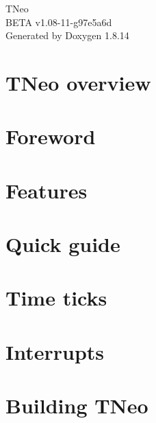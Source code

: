 \documentclass[twoside]{book}
\newcommand{\+}{\discretionary{\mbox{\scriptsize$\hookleftarrow$}}{}{}}
\newcommand{\clearemptydoublepage}{%
  \newpage{\pagestyle{empty}\cleardoublepage}%
}
\begin{document}
\hypersetup{pageanchor=false,
             bookmarksnumbered=true,
             pdfencoding=unicode
            }
\begin{titlepage}
\vspace*{7cm}
\begin{center}%
{\Large T\+Neo \\[1ex]\large B\+E\+TA v1.\+08-\/11-\/g97e5a6d }\\
\vspace*{1cm}
{\large Generated by Doxygen 1.8.14}\\
\end{center}
\end{titlepage}
\clearemptydoublepage
{}
\tableofcontents
\clearemptydoublepage
{}
\hypersetup{pageanchor=true}

\chapter{T\+Neo overview}
\label{index}\hypertarget{index}{}
\chapter{Foreword}
\label{foreword}

\chapter{Features}
\label{features}

\chapter{Quick guide}
\label{quick_guide}

\chapter{Time ticks}
\label{time_ticks}

\chapter{Interrupts}
\label{interrupts}

\chapter{Building T\+Neo}
\label{building}

\end{document}
